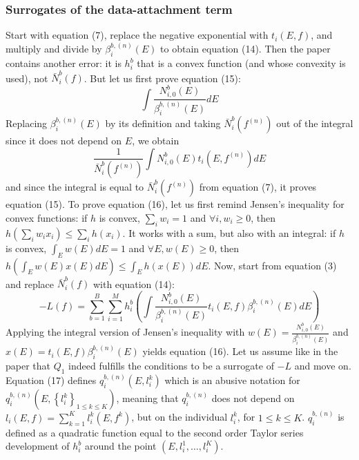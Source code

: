 \documentclass[a4paper, 10pt]{article}
\begin{document}
\subsubsection{Surrogates of the data-attachment term}
Start with equation (7), replace the negative exponential with $t_i(E,f)$, and multiply and divide by $\beta_i^{b,(n)}(E)$ to obtain equation (14). 
Then the paper contains another error: it is $h_i^b$ that is a convex function (and whose convexity is used), not $\bar{N}_i^b(f)$.
But let us first prove equation (15):
\begin{equation*}
 \int\frac{N_{i,0}^b(E)}{\beta_i^{b, (n)}(E)}dE 
\end{equation*}
Replacing $\beta_i^{b, (n)}(E)$ by its definition and taking $\bar{N}_i^b(f^{(n)})$ out of the integral since it does not depend on $E$, we obtain
\begin{equation*}
 \frac{1}{\bar{N}_i^b(f^{(n)})} \int N_{i,0}^b(E) t_i(E,f^{(n)})dE 
\end{equation*}
and since the integral is equal to $\bar{N}_i^b(f^{(n)})$ from equation (7), it proves equation (15).
To prove equation (16), let us first remind Jensen's inequality for convex functions: if $h$ is convex, $\sum_i w_i = 1$ and $\forall i, w_i \geq 0$, then
$h\left(\sum_i w_i x_i\right) \leq \sum_i h(x_i)$. It works with a sum, but also with an integral: if $h$ is convex, $\int_E w(E) dE = 1$ and $\forall E, w(E) \geq 0$, then
$h\left(\int_E w(E) x(E)dE\right) \leq \int_E h\left(x(E)\right)dE$.
Now, start from equation (3) and replace $\bar{N}_i^b(f)$ with equation (14):
\begin{equation*}
 -L(f) = \sum_{b=1}^B \sum_{i=1}^M h_i^b\left( \int \frac{N_{i,0}^b(E)}{\beta_i^{b, (n)}(E)} t_i(E,f) \beta_i^{b, (n)}(E) dE \right)
\end{equation*}
Applying the integral version of Jensen's inequality with $w(E) = \frac{N_{i,0}^b(E)}{\beta_i^{b, (n)}(E)}$ and $x(E) = t_i(E,f) \beta_i^{b, (n)}(E)$ yields equation (16).
Let us assume like in the paper that $Q_1$ indeed fulfills the conditions to be a surrogate of $-L$ and move on. Equation (17) defines $q_i^{b, (n)}(E, l_i^k)$
which is an abusive notation for $q_i^{b, (n)}\left(E, \left\lbrace l_i^k \right\rbrace_{1 \leq k \leq K}\right)$, meaning that $q_i^{b, (n)}$ does not depend on 
$l_i(E, f) = \sum_{k=1}^K l_i^k(E, f^k)$, but on the individual $l_i^k$, for $1 \leq k \leq K$.
$q_i^{b, (n)}$ is defined as a quadratic function equal to the second order Taylor series development of $h_i^b$ around the point $(E, l_i^1, \hdots, l_i^K)$. 
\end{document}
